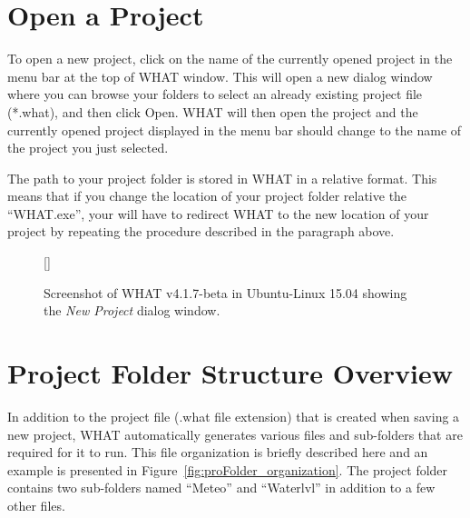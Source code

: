 \documentclass[WHATMANUAL.tex]{subfiles}
\begin{document}
\section{Open a Project}

To open a new project, click on the name of the currently opened project in the menu bar at the top of WHAT window. This will open a new dialog window where you can browse your folders to select an already existing project file (*.what), and then click Open. WHAT will then open the project and the currently opened project displayed in the menu bar should change to the name of the project you just selected.

The path to your project folder is stored in WHAT in a relative format. This means that if you change the location of your project folder relative the ``WHAT.exe'', your will have to redirect WHAT to the new location of your project by repeating the procedure described in the paragraph above.

\begin{figure}[!h]
    \setlength{\fboxsep}{0pt}
    [\FBwidth]
	{
	 \caption{Screenshot of WHAT v4.1.7-beta in Ubuntu-Linux 15.04 showing the \emph{New Project} dialog window.}
	 \label{fig:new_proj_win}
	}
	{
	}
\end{figure}

\section{Project Folder Structure Overview}\label{subsec:folder_structure}

In addition to the project file (.what file extension) that is created when saving a new project, WHAT automatically generates various files and sub-folders that are required for it to run. This file organization is briefly described here and an example is presented in Figure~\ref{fig:proFolder_organization}. The project folder contains two sub-folders named ``Meteo'' and ``Waterlvl'' in addition to a few other files.
\end{document}
